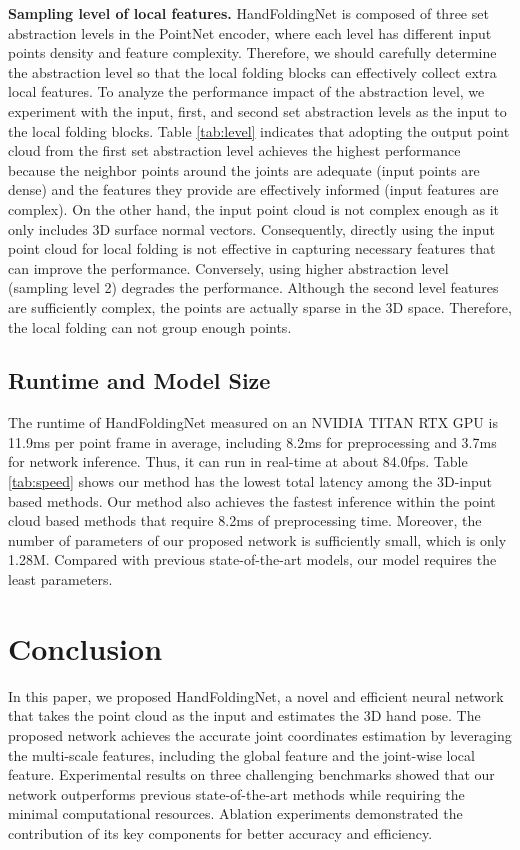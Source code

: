 \documentclass[10pt,twocolumn,letterpaper]{article}
\begin{document}
\noindent
\textbf{Sampling level of local features.}
HandFoldingNet is composed of three set abstraction levels in the PointNet encoder, where each level has different input points density and feature complexity. Therefore, we should carefully determine the abstraction level so that the local folding blocks can effectively collect extra local features.
To analyze the performance impact of the abstraction level, we experiment with the input, first, and second set abstraction levels as the input to the local folding blocks. Table \ref{tab:level} indicates that adopting the output point cloud from the first set abstraction level achieves the highest performance because the neighbor points around the joints are adequate (input points are dense) and the features they provide are effectively informed (input features are complex). On the other hand, the input point cloud is not complex enough as it only includes 3D surface normal vectors.
Consequently, directly using the input point cloud for local folding is not effective in capturing necessary features that can improve the performance. 
Conversely, using higher abstraction level (sampling level 2) degrades the performance. Although the second level features are sufficiently complex, the points are actually sparse in the 3D space. Therefore, the local folding can not group enough points.



\subsection{Runtime and Model Size}

The runtime of HandFoldingNet measured on an NVIDIA TITAN RTX GPU is 11.9ms per point frame in average, including 8.2ms for preprocessing and 3.7ms for network inference. Thus, it can run in real-time at about 84.0fps.
Table \ref{tab:speed} shows our method has the lowest total latency among the 3D-input based methods. Our method also achieves the fastest inference within the point cloud based methods that require 8.2ms of preprocessing time. 
Moreover, the number of parameters of our proposed network is sufficiently small, which is only 1.28M. Compared with previous state-of-the-art models, our model requires the least parameters. 



\section{Conclusion}
In this paper, we proposed HandFoldingNet, a novel and efficient neural network that takes the point cloud as the input and estimates the 3D hand pose. The proposed network achieves the accurate joint coordinates estimation by leveraging the multi-scale features, including the global feature and the joint-wise local feature. Experimental results on three challenging benchmarks showed that our network outperforms previous state-of-the-art methods while requiring the minimal computational resources. Ablation experiments demonstrated the contribution of its key components for better accuracy and efficiency.
\end{document}
